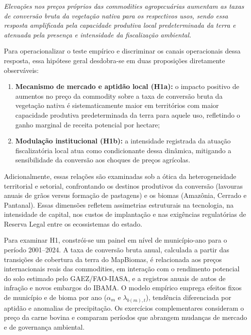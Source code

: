 \noindent\emph{Elevações nos preços próprios das commodities agropecuárias aumentam as taxas de conversão bruta da vegetação nativa para os respectivos usos, sendo essa resposta amplificada pela capacidade produtiva local predeterminada da terra e atenuada pela presença e intensidade da fiscalização ambiental.}

\medskip

Para operacionalizar o teste empírico e discriminar os canais operacionais dessa resposta, essa hipótese geral desdobra-se em duas proposições diretamente observáveis:

\begin{enumerate}[label=(\alph*),leftmargin=1.8cm,itemsep=2pt,topsep=2pt]
    \item \textbf{Mecanismo de mercado e aptidão local (H1a):} o impacto positivo de aumentos no preço da commodity sobre a taxa de conversão bruta da vegetação nativa é sistematicamente maior em territórios com maior capacidade produtiva predeterminada da terra para aquele uso, refletindo o ganho marginal de receita potencial por hectare;
    \item \textbf{Modulação institucional (H1b):} a intensidade registrada da atuação fiscalizatória local atua como condicionante dessa dinâmica, mitigando a sensibilidade da conversão aos choques de preços agrícolas.
\end{enumerate}

Adicionalmente, essas relações são examinadas sob a ótica da heterogeneidade territorial e setorial, confrontando os destinos produtivos da conversão (lavouras anuais de grãos versus formação de pastagens) e os biomas (Amazônia, Cerrado e Pantanal). Essas dimensões refletem assimetrias estruturais na tecnologia, na intensidade de capital, nos custos de implantação e nas exigências regulatórias de Reserva Legal entre os ecossistemas do estado.


Para examinar H1, constrói-se um painel em nível de município-ano para o período 2001--2024. A taxa de conversão bruta anual, calculada a partir das transições de cobertura da terra do MapBiomas, é relacionada aos preços internacionais reais das commodities, em interação com o rendimento potencial do solo estimado pelo GAEZ/FAO-IIASA, e a registros anuais de autos de infração e novos embargos do IBAMA. O modelo empírico emprega efeitos fixos de município e de bioma por ano ($\alpha_m$ e $\lambda_{b(m),t}$), tendência diferenciada por aptidão e anomalias de precipitação. Os exercícios complementares consideram o preço da carne bovina e comparam períodos que abrangem mudanças de mercado e de governança ambiental.

